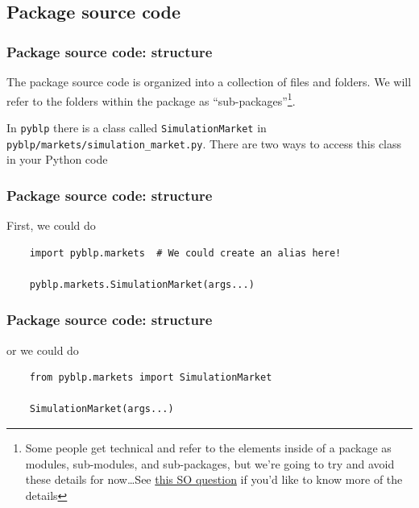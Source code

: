 \documentclass[10pt]{beamer}
\begin{document}
  \subsection{Package source code}

  \begin{frame} \frametitle{Package source code: structure}

    The package source code is organized into a collection of files and folders. We will
    refer to the folders within the package as ``sub-packages''\footnote{
    Some people get technical and refer to the elements inside of a package as modules,
    sub-modules, and sub-packages, but we're going to try and avoid these details for
    now\dots See
    \href{
    https://stackoverflow.com/questions/7948494/whats-the-difference-between-a-python-module-and-a-python-package
    }{this SO question} if you'd like to know more of the details}.

    In \texttt{pyblp} there is a class called \texttt{SimulationMarket} in
    \texttt{pyblp/markets/simulation\_market.py}. There are two ways to access this class in
    your Python code

  \end{frame}

  \begin{frame}[fragile] \frametitle{Package source code: structure}

    First, we could do

    \vspace{0.5cm}

    \begin{lstlisting}
    import pyblp.markets  # We could create an alias here!

    pyblp.markets.SimulationMarket(args...)
    \end{lstlisting}

  \end{frame}

  \begin{frame}[fragile] \frametitle{Package source code: structure}

    or we could do

    \vspace{0.5cm}

    \begin{lstlisting}
    from pyblp.markets import SimulationMarket

    SimulationMarket(args...)
    \end{lstlisting}

  \end{frame}
\end{document}
